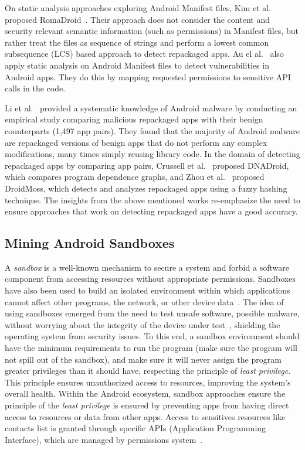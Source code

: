On static analysis approaches exploring Android Manifest files, Kim et al. proposed RomaDroid~\cite{DBLP:journals/access/KimLCP19}.  Their approach does not consider the content and security relevant semantic information (such as permissions) in Manifest files, but rather treat the files as sequence of strings and perform a lowest common subsequence (LCS) based approach to detect repackaged apps. Au el al.~\cite{DBLP:conf/ccs/AuZHL12} also apply static analysis on Android Manifest files to detect vulnerabilities in Android apps. They do this by mapping requested permissions to sensitive API calls in the code. 

Li et al.~\cite{DBLP:journals/tifs/0029LBKTLC17} provided a systematic knowledge of Android malware by conducting an empirical study comparing malicious repackaged apps with their benign counterparts (1,497 app pairs). They found that the majority of Android malware are repackaged versions of benign apps that do not perform any complex modifications, many times simply reusing library code.  In the domain of detecting repackaged apps by comparing app pairs, Crussell et al.~\cite{DBLP:conf/esorics/CrussellGC12} proposed  DNADroid, which compares program dependence graphs, and Zhou et al.~\cite{DBLP:conf/codaspy/ZhouZJN12} proposed DroidMoss, which detects and analyzes repackaged apps using a fuzzy hashing technique. The insights from the above mentioned works re-emphasize the need to ensure approaches that work on detecting repackaged apps have a good accuracy. 

\subsection{Mining Android Sandboxes}\label{sec:android-sandbox}

A \emph{sandbox}
is a well-known mechanism to secure a system and forbid a software component from accessing
resources without appropriate permissions. Sandboxes have also been used to build an isolated
environment within which applications cannot affect other programs, the network, or other device data~\cite{DBLP:journals/peerj-cs/MaassSCS16}. The idea of using sandboxes emerged from the
need to test unsafe software, possible malware, without worrying about the integrity of the
device under test~\cite{DBLP:conf/esorics/BordoniCS17}, shielding the operating system from security issues.
To this end, a sandbox environment should have the minimum requirements to run the
program (make sure the program will not spill out of the sandbox), and make sure it will never
assign the program greater privileges than it should have, respecting the principle of
\emph{least privilege}. This principle ensures unauthorized access to resources,
improving the system's overall health. Within the Android ecosystem, sandbox approaches ensure the principle
of the \emph{least privilege} is ensured by preventing apps from having direct access to resources or data from other apps. Access to sensitives resources
like contacts list is granted through specific APIs (Application Programming Interface),
which are managed by permissions system~\cite{DBLP:journals/corr/abs-2109-06613}. 

